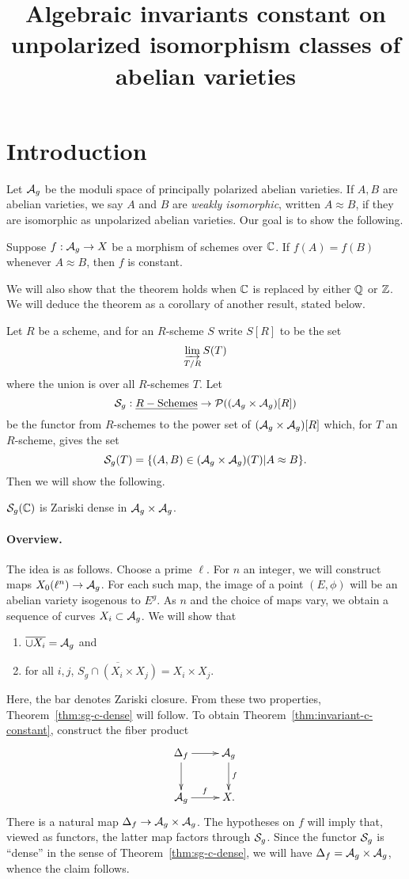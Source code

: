 \documentclass{amsart}
\title{Algebraic invariants constant on unpolarized isomorphism classes of abelian varieties}
\begin{document}
\maketitle

\section{Introduction}
\label{sec:introduction}

Let $\mathcal{A}_g$ be the moduli space of principally polarized abelian varieties. If $A, B$ are abelian varieties, we say $A$ and $B$ are \emph{weakly isomorphic}, written $A \approx B$, if they are isomorphic as unpolarized abelian varieties. Our goal is to show the following.
\begin{theorem}\label{thm:invariant-c-constant}
  Suppose $f: \mathcal{A}_g \to X$ be a morphism of schemes over $\mathbb{C}$. If $f(A) = f(B)$ whenever $A \approx B$, then $f$ is constant.
\end{theorem}
We will also show that the theorem holds when $\mathbb{C}$ is replaced by either $\mathbb{Q}$ or $\mathbb{Z}$. We will deduce the theorem as a corollary of another result, stated below.

Let $R$ be a scheme, and for an $R$-scheme $S$ write $S[R]$ to be the set
\[
  \varinjlim_{T/R} S(T)
\]
where the union is over all $R$-schemes $T$. Let
\[
  \mathcal{S}_g: \underline{R-\textrm{Schemes}} \to \mathcal{P}((\mathcal{A}_g \times \mathcal{A}_g)[R])
\]
be the functor from $R$-schemes to the power set of $(\mathcal{A}_g \times \mathcal{A}_g)[R]$ which, for $T$ an $R$-scheme, gives the set
\[
  \mathcal{S}_g(T) = \{(A,B) \in (\mathcal{A}_g \times \mathcal{A}_g)(T) | A \approx B\}.
\]
Then we will show the following.
\begin{theorem}\label{thm:sg-c-dense}
  $\mathcal{S}_g(\mathbb{C})$ is Zariski dense in $\mathcal{A}_g \times \mathcal{A}_g$.
\end{theorem}

\paragraph{Overview.}

The idea is as follows. Choose a prime $\ell$. For $n$ an integer, we will construct maps $X_0(\ell^n) \to \mathcal{A}_g$. For each such map, the image of a point $(E, \phi)$ will be an abelian variety isogenous to $E^g$. As $n$ and the choice of maps vary, we obtain a sequence of curves $X_i \subset \mathcal{A}_g$. We will show that
\begin{enumerate}
    \item\label{i:curves-dense} $\overline{\cup X_i} = \mathcal{A}_g$ and
    \item\label{i:Sg-dense} for all $i,j$, $\overline{S_g \cap (X_i \times X_j)} = X_i \times X_j$.
\end{enumerate}
Here, the bar denotes Zariski closure. From these two properties, Theorem~\ref{thm:sg-c-dense} will follow. To obtain Theorem~\ref{thm:invariant-c-constant}, construct the fiber product
\[
  \xymatrix{
    \df \ar[r] \ar[d] & \ag \ar[d]^f \\
    \ag \ar[r]^f & X.
  }
\]
There is a natural map $\Delta_f \to \mathcal{A}_g \times \mathcal{A}_g$. The hypotheses on $f$ will imply that, viewed as functors, the latter map factors through $\mathcal{S}_g$. Since the functor $\mathcal{S}_g$ is ``dense'' in the sense of Theorem~\ref{thm:sg-c-dense}, we will have $\Delta_f = \mathcal{A}_g \times \mathcal{A}_g$, whence the claim follows.
\end{document}
